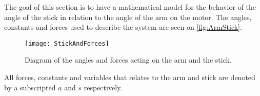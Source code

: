 		\graphicspath{{figures/Preanalysis&Requirement/PendulumModeling/}}
		The goal of this section is to have a mathematical model for the behavior of the angle of the stick in relation to the angle of the arm on the motor. The angles, constants and forces used to describe the system are seen on \autoref{fig:ArmStick}.
		\begin{figure}[htbp]
			\centering
			\texttt{[image: StickAndForces]}
			\caption{Diagram of the angles and forces acting on the arm and the stick.}
			\label{fig:ArmStick}
		\end{figure}
		
		\startexplain
		\stopexplain
		All forces, constants and variables that relates to the arm and stick are denoted by a subscripted $a$ and $s$ respectively. 
		
